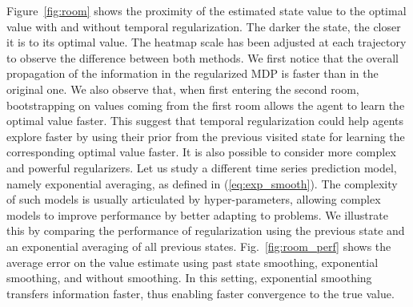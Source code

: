 \documentclass{article}
\begin{document}
Figure~\ref{fig:room} shows the proximity of the estimated state value to the optimal value with and without temporal regularization. The darker the state, the closer it is to its optimal value. The heatmap scale has been adjusted at each trajectory to observe the difference between both methods.
We first notice that the overall propagation of the information in the regularized MDP is faster than in the original one. We also observe that, when first entering the second room, bootstrapping on values coming from the first room allows the agent to learn the optimal value faster. This suggest that temporal regularization could help agents explore faster by using their prior from the previous visited state for learning the corresponding optimal value faster. It is also possible to consider more complex and powerful regularizers. Let us study a different time series prediction model, namely exponential averaging, as defined in (\ref{eq:exp_smooth}). The complexity of such models is usually articulated by hyper-parameters, allowing complex models to improve performance by better adapting to problems. We illustrate this by comparing the performance of regularization using the previous state and an exponential averaging of all previous states. Fig.~\ref{fig:room_perf} shows the average error on the value estimate using past state smoothing, exponential smoothing, and without smoothing. In this setting, exponential smoothing transfers information faster, thus enabling faster convergence to the true value.
\end{document}
